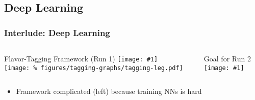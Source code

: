 \documentclass[usenames,dvipsnames]{beamer}
\newcommand{\widegraphic}[1]{\texttt{[image: \#1]}}
\begin{document}

\subsection{Deep Learning}

\begin{frame}
  \frametitle{Interlude: Deep Learning}
  \begin{columns}
    \begin{column}{0.6\textwidth}
      \begin{center}
        Flavor-Tagging Framework (Run 1)
        \widegraphic{%
figures/tagging-graphs/tagging-full-nogaia.pdf} \\
        \texttt{[image: \%
figures/tagging-graphs/tagging-leg.pdf]}
      \end{center}
    \end{column}
    \vline
    \begin{column}{0.4\textwidth}
      \begin{center}
        Goal for Run 2 \\[0.1cm]
        \widegraphic{%
figures/tagging-graphs/tagging-gaia-future.pdf}
      \end{center}
    \end{column}
  \end{columns}
  \begin{itemize}
  \item Framework complicated (left) because training NNs is hard
  \end{itemize}
\end{frame}
\end{document}
